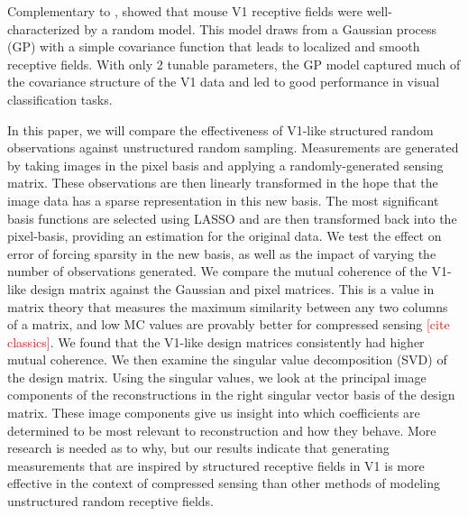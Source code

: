 \documentclass{article}
\newcommand{\todo}[1]{\textcolor{red}{[#1]}}
\newcommand{\note}[1]{\textcolor{blue}{NOTE: #1}}
\begin{document}
Complementary to \cite{olshausenSparseCodingOvercomplete1997},
\cite{pandeyStructuredRandomReceptive} showed that mouse V1 receptive fields were well-characterized by a random model.
This model draws from a Gaussian process (GP) with a simple covariance function that leads to localized and smooth receptive fields.
With only 2 tunable parameters, the GP model captured much of the covariance structure of the V1 data and led to good performance in visual classification tasks.




In this paper, we will compare the effectiveness of V1-like structured random observations against unstructured random sampling.
Measurements are generated by taking images in the pixel basis and applying a randomly-generated sensing matrix.
These observations are then linearly transformed in the hope that the image data has a sparse representation in this new basis.
The most significant basis functions are selected using LASSO and are then transformed back into the pixel-basis, providing an estimation for the original data. 
We test the effect on error of forcing sparsity in the new basis, as well as the impact of varying the number of observations generated.
We compare the mutual coherence of the V1-like design matrix against the Gaussian and pixel matrices. This is a value in matrix theory that measures the maximum similarity between any two columns of a matrix, and low MC values are provably better for compressed sensing \todo{cite classics}. 
We found that the V1-like design matrices consistently had higher mutual coherence.
We then examine the singular value decomposition (SVD) of the design matrix.
Using the singular values, we look at the principal image components of the reconstructions in the right singular vector basis of the design matrix. 
These image components give us insight into which coefficients are determined to be most relevant to reconstruction and how they behave.
More research is needed as to why, but our results indicate that generating measurements that are inspired by structured receptive fields in V1 is more effective in the context of compressed sensing than other methods of modeling unstructured random receptive fields.
\end{document}
